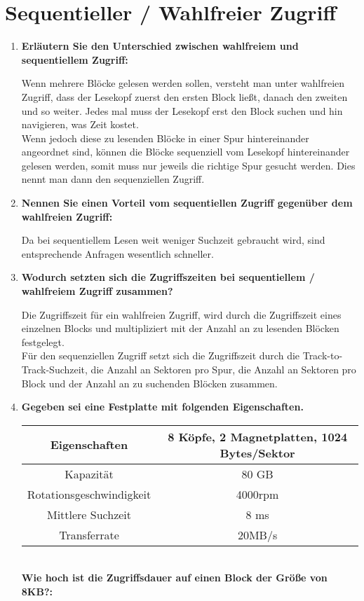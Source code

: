 \documentclass{scrartcl}
\begin{document}
\section{Sequentieller / Wahlfreier Zugriff}
\begin{enumerate}
    \item \textbf{Erläutern Sie den Unterschied zwischen wahlfreiem und sequentiellem Zugriff:}
    
    Wenn mehrere Blöcke gelesen werden sollen, versteht man unter wahlfreien Zugriff, dass der Lesekopf zuerst den ersten Block ließt, danach den zweiten und so weiter. Jedes mal muss der Lesekopf erst den Block suchen und hin navigieren, was Zeit kostet. \\
    Wenn jedoch diese zu lesenden Blöcke in einer Spur hintereinander angeordnet sind, können die Blöcke sequenziell vom Lesekopf hintereinander gelesen werden, somit muss nur jeweils die richtige Spur gesucht werden. Dies nennt man dann den sequenziellen Zugriff. 
    \item \textbf{Nennen Sie einen Vorteil vom sequentiellen Zugriff gegenüber dem wahlfreien Zugriff:}
    
    Da bei sequentiellem Lesen weit weniger Suchzeit gebraucht wird, sind entsprechende Anfragen wesentlich schneller.
    \item \textbf{Wodurch setzten sich die Zugriffszeiten bei sequentiellem / wahlfreiem Zugriff zusammen?}
    
    Die Zugriffszeit für ein wahlfreien Zugriff, wird durch die Zugriffszeit eines einzelnen Blocks und multipliziert mit der Anzahl an zu lesenden Blöcken festgelegt. \\
    Für den sequenziellen Zugriff setzt sich die Zugriffszeit durch die Track-to-Track-Suchzeit, die Anzahl an Sektoren pro Spur, die Anzahl an Sektoren pro Block  und der Anzahl an zu suchenden Blöcken zusammen.
    \item \textbf{Gegeben sei eine Festplatte mit folgenden Eigenschaften.}\bigskip\\
    \begin{tabular}{|c|c|}
        \hline
        Eigenschaften & 8 Köpfe, 2 Magnetplatten, 1024 Bytes/Sektor \\
        \hline
        Kapazität & 80 GB\\
        \hline
        Rotationsgeschwindigkeit & 4000rpm\\
        \hline
        Mittlere Suchzeit & 8 ms\\
        \hline
        Transferrate & 20MB/s\\
        \hline
    \end{tabular}\bigskip\\
    \textbf{Wie hoch ist die Zugriffsdauer auf einen Block der Größe von 8KB?:}
    

\end{enumerate}
\end{document}
